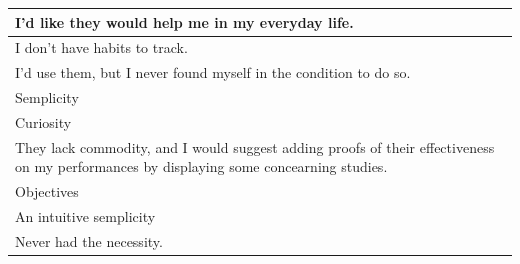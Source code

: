 \documentclass{article}
\begin{document}
\begin{table}[H]
\begin{tabularx}{0.9\textwidth}{X}
		\hline
		I'd like they would help me in my everyday life.                                                                                                                                                                                    \\
		\hline
		I don't have habits to track.                                                                                                                                                                                                       \\
		\hline
		I'd use them, but I never found myself in the condition to do so.                                                                                                                                                                   \\
		\hline
		Semplicity                                                                                                                                                                                                                          \\
		\hline
		Curiosity                                                                                                                                                                                                                           \\
		\hline
		They lack commodity, and I would suggest adding proofs of their effectiveness on my performances by displaying some concearning studies.                                                                                            \\
		\hline
		Objectives                                                                                                                                                                                                                          \\
		\hline
		An intuitive semplicity                                                                                                                                                                                                             \\
		\hline
		Never had the necessity.                                                                                                                                                                                                            \\
		\hline
	\end{tabularx}
\end{table}
\end{document}
